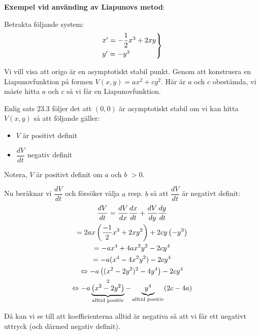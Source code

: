 \newpage
\noindent\textbf{Exempel vid använding av Liapunovs metod}:
\par\bigskip

\noindent Betrakta följande system:
\begin{equation*}
  \begin{gathered}
    \begin{rcases*}
      x^{\prime} = -\dfrac{1}{2}x^3+2xy\\
      y^{\prime} = -y^3
    \end{rcases*}
  \end{gathered}
\end{equation*}
\par\bigskip
\noindent Vi vill visa att origo är en asymptotiskt stabil punkt. Genom att konstruera en Liapunovfunktion på formen $V(x,y) = ax^2+cy^2$. Här är $a$ och $c$ obestämda, vi måste hitta $a$ och $c$ så vi får en Liapunovfunktion.\par
\noindent Enlig sats 23.3 följer det att $(0,0)$ är asymptotiskt stabil om vi kan hitta $V(x,y)$ så att följande gäller:
\begin{itemize}
  \item $V$ är positivt definit
  \item $\dfrac{dV}{dt}$ negativ definit
\end{itemize}
\par\bigskip
\noindent Notera, $V$ är positivt definit om $a$ och $b$ $>0$.
\par\bigskip
\noindent Nu beräknar vi $\dfrac{dV}{dt}$ och försöker välja $a$ resp. $b$ så att $\dfrac{dV}{dt}$ är negativt definit:
\begin{equation*}
  \begin{gathered}
    \dfrac{dV}{dt} = \dfrac{dV}{dx}\dfrac{dx}{dt}+\dfrac{dV}{dy}\dfrac{dy}{dt}\\
    = 2ax\left(\dfrac{-1}{2}x^3+2xy^2\right) + 2cy\left(-y^3\right)\\
    = -ax^4+4ax^2y^2-2cy^4\\
    = -a(x^4-4x^2y^2)-2cy^4\\
    \Leftrightarrow -a\left((x^2-2y^2)^2-4y^4\right)-2cy^4\\
    \Leftrightarrow -a\underbrace{\left(x^2-2y^2\right)}_{\text{alltid positiv}}^2-\underbrace{y^4}_{\text{alltid positiv}}(2c-4a)
  \end{gathered}
\end{equation*}
\par\bigskip
\noindent Då kan vi se till att koefficienterna alltid är negativa så att vi får ett negativt uttryck (och därmed negativ definit). \par
